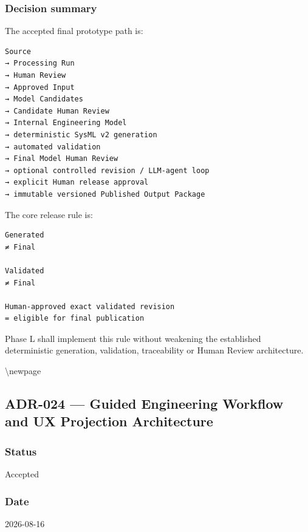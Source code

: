 \hypertarget{decision-summary}{%
\subsubsection{Decision summary}\label{decision-summary}}

The accepted final prototype path is:

\begin{verbatim}
Source
→ Processing Run
→ Human Review
→ Approved Input
→ Model Candidates
→ Candidate Human Review
→ Internal Engineering Model
→ deterministic SysML v2 generation
→ automated validation
→ Final Model Human Review
→ optional controlled revision / LLM-agent loop
→ explicit Human release approval
→ immutable versioned Published Output Package
\end{verbatim}

The core release rule is:

\begin{verbatim}
Generated
≠ Final

Validated
≠ Final

Human-approved exact validated revision
= eligible for final publication
\end{verbatim}

Phase L shall implement this rule without weakening the established deterministic generation, validation, traceability or Human Review architecture.

\textbackslash newpage

\hypertarget{adr-024--guided-engineering-workflow-and-ux-projection-architecture}{%
\subsection{ADR-024 --- Guided Engineering Workflow and UX Projection Architecture}\label{adr-024--guided-engineering-workflow-and-ux-projection-architecture}}

\hypertarget{status-6}{%
\subsubsection{Status}\label{status-6}}

Accepted

\hypertarget{date-6}{%
\subsubsection{Date}\label{date-6}}

2026-08-16

